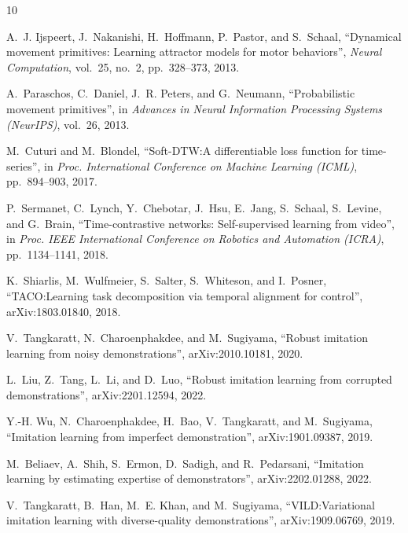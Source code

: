 \documentclass[a4paper, 10pt, conference]{ieeeconf}
\begin{document}

\begin{thebibliography}{10}

    A.~J. Ijspeert, J.~Nakanishi, H.~Hoffmann, P.~Pastor, and S.~Schaal,
    ``Dynamical movement primitives: Learning attractor models for motor behaviors'',
    \emph{Neural Computation}, vol.~25, no.~2, pp.~328--373, 2013.

    A.~Paraschos, C.~Daniel, J.~R. Peters, and G.~Neumann,
    ``Probabilistic movement primitives'',
    in \emph{Advances in Neural Information Processing Systems (NeurIPS)}, vol.~26, 2013.

    M.~Cuturi and M.~Blondel,
    ``Soft-DTW:\@ A differentiable loss function for time-series'',
    in \emph{Proc. International Conference on Machine Learning (ICML)}, pp.~894--903, 2017.

    P.~Sermanet, C.~Lynch, Y.~Chebotar, J.~Hsu, E.~Jang, S.~Schaal, S.~Levine, and G.~Brain,
    ``Time-contrastive networks: Self-supervised learning from video'',
    in \emph{Proc. IEEE International Conference on Robotics and Automation (ICRA)},
    pp.~1134--1141, 2018.

    K.~Shiarlis, M.~Wulfmeier, S.~Salter, S.~Whiteson, and I.~Posner,
    ``TACO:\@ Learning task decomposition via temporal alignment for control'',
    arXiv:1803.01840, 2018.

    V.~Tangkaratt, N.~Charoenphakdee, and M.~Sugiyama,
    ``Robust imitation learning from noisy demonstrations'',
    arXiv:2010.10181, 2020.

    L.~Liu, Z.~Tang, L.~Li, and D.~Luo,
    ``Robust imitation learning from corrupted demonstrations'',
    arXiv:2201.12594, 2022.

    Y.-H. Wu, N.~Charoenphakdee, H.~Bao, V.~Tangkaratt, and M.~Sugiyama,
    ``Imitation learning from imperfect demonstration'',
    arXiv:1901.09387, 2019.

    M.~Beliaev, A.~Shih, S.~Ermon, D.~Sadigh, and R.~Pedarsani,
    ``Imitation learning by estimating expertise of demonstrators'',
    arXiv:2202.01288, 2022.

    V.~Tangkaratt, B.~Han, M.~E. Khan, and M.~Sugiyama,
    ``VILD:\@ Variational imitation learning with diverse-quality demonstrations'',
    arXiv:1909.06769, 2019.


\end{thebibliography}
\end{document}
